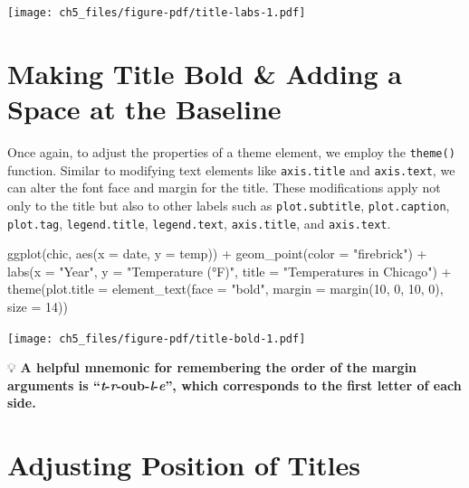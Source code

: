 \documentclass[
  letterpaper,
  DIV=11,
  numbers=noendperiod]{scrreprt}
\newenvironment{Shaded}{\begin{snugshade}}{\end{snugshade}}
\newcommand{\AttributeTok}[1]{\textcolor[rgb]{0.40,0.45,0.13}{#1}}
\newcommand{\DecValTok}[1]{\textcolor[rgb]{0.68,0.00,0.00}{#1}}
\newcommand{\FunctionTok}[1]{\textcolor[rgb]{0.28,0.35,0.67}{#1}}
\newcommand{\NormalTok}[1]{\textcolor[rgb]{0.00,0.23,0.31}{#1}}
\newcommand{\SpecialCharTok}[1]{\textcolor[rgb]{0.37,0.37,0.37}{#1}}
\newcommand{\StringTok}[1]{\textcolor[rgb]{0.13,0.47,0.30}{#1}}
\begin{document}
\texttt{[image: ch5\_files/figure-pdf/title-labs-1.pdf]}

\section{Making Title Bold \& Adding a Space at the
Baseline}\label{making-title-bold-adding-a-space-at-the-baseline}

Once again, to adjust the properties of a theme element, we employ the
\texttt{theme()} function. Similar to modifying text elements like
\texttt{axis.title} and \texttt{axis.text}, we can alter the font face
and margin for the title. These modifications apply not only to the
title but also to other labels such as \texttt{plot.subtitle},
\texttt{plot.caption}, \texttt{plot.tag}, \texttt{legend.title},
\texttt{legend.text}, \texttt{axis.title}, and \texttt{axis.text}.

\begin{Shaded}
\begin{Highlighting}[]
\FunctionTok{ggplot}\NormalTok{(chic, }\FunctionTok{aes}\NormalTok{(}\AttributeTok{x =}\NormalTok{ date, }\AttributeTok{y =}\NormalTok{ temp)) }\SpecialCharTok{+}
  \FunctionTok{geom\_point}\NormalTok{(}\AttributeTok{color =} \StringTok{"firebrick"}\NormalTok{) }\SpecialCharTok{+}
  \FunctionTok{labs}\NormalTok{(}\AttributeTok{x =} \StringTok{"Year"}\NormalTok{, }\AttributeTok{y =} \StringTok{"Temperature (°F)"}\NormalTok{,}
       \AttributeTok{title =} \StringTok{"Temperatures in Chicago"}\NormalTok{) }\SpecialCharTok{+}
  \FunctionTok{theme}\NormalTok{(}\AttributeTok{plot.title =} \FunctionTok{element\_text}\NormalTok{(}\AttributeTok{face =} \StringTok{"bold"}\NormalTok{,}
                                  \AttributeTok{margin =} \FunctionTok{margin}\NormalTok{(}\DecValTok{10}\NormalTok{, }\DecValTok{0}\NormalTok{, }\DecValTok{10}\NormalTok{, }\DecValTok{0}\NormalTok{),}
                                  \AttributeTok{size =} \DecValTok{14}\NormalTok{))}
\end{Highlighting}
\end{Shaded}

\texttt{[image: ch5\_files/figure-pdf/title-bold-1.pdf]}

💡 \textbf{A helpful mnemonic for remembering the order of the margin
arguments is ``\emph{t}-\emph{r}-oub-\emph{l}-\emph{e}'', which
corresponds to the first letter of each side.}

\section{Adjusting Position of
Titles}\label{adjusting-position-of-titles}
\end{document}
